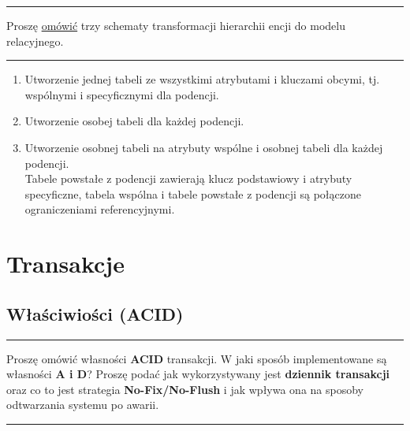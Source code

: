\documentclass[a5paper,6pt]{article}
\newcommand{\horrule}[1]{\rule{\linewidth}{#1}}
\begin{document}
    \horrule{0.5pt}
    Proszę \underline{omówić} trzy schematy transformacji hierarchii encji do
    modelu relacyjnego.\\
    \horrule{0.5pt}

    \begin{enumerate}
        \item Utworzenie jednej tabeli ze wszystkimi atrybutami i kluczami
              obcymi, tj. wspólnymi i specyficznymi dla podencji.
        \item Utworzenie osobej tabeli dla każdej podencji.
        \item Utworzenie osobnej tabeli na atrybuty wspólne i osobnej tabeli
              dla każdej podencji.\\
              Tabele powstałe z podencji zawierają klucz podstawiowy i atrybuty
              specyficzne, tabela wspólna i tabele powstałe z podencji są
              połączone ograniczeniami referencyjnymi.
    \end{enumerate}


    \section{Transakcje} %
    \label{sec:transakcje}

    \subsection{Właściwiości (ACID)} %
    \label{sub:wlasciwiosci}

    \horrule{0.5pt}
     Proszę omówić własności \textbf{ACID} transakcji. W jaki sposób
          implementowane są własności \textbf{A i D}? Proszę podać jak
          wykorzystywany jest \textbf{dziennik transakcji} oraz co to jest
          strategia \textbf{No-Fix/No-Flush} i jak wpływa ona na sposoby
          odtwarzania systemu po awarii.\\
    \horrule{0.5pt}
\end{document}
